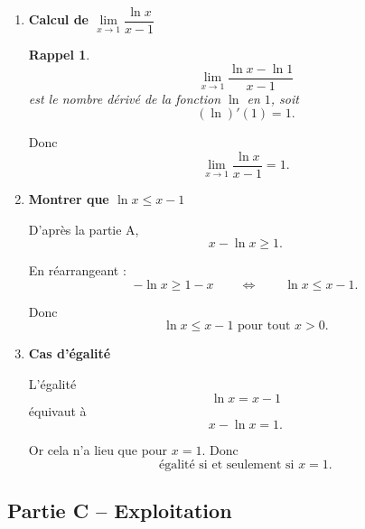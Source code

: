 \documentclass[11pt,a4paper]{article}
\newtheorem*{rappel}{Rappel}
\begin{document}
\begin{enumerate}[label=\textbf{1.\arabic*}, resume, leftmargin=1.6em]
Le dénominateur \((x-1)^2\) est strictement positif pour \(x\neq 1\).  
Le signe de \(f'(x)\) est donc celui de
\[
\frac{x-1}{x}-\ln x,
\]
qui est toujours négatif pour \(x\neq 1\).

Ainsi :
\[
\boxed{f \text{ est strictement décroissante sur } ]0,1[ \text{ et sur } ]1,+\infty[.}
\]

\item \textbf{Calcul de \(\lim\limits_{x\to 1}\dfrac{\ln x}{x-1}\)}

\begin{rappel}
\[
\lim_{x\to 1}\frac{\ln x-\ln 1}{x-1}
\]
est le nombre dérivé de la fonction \(\ln\) en \(1\), soit
\[
(\ln)'(1)=1.
\]
\end{rappel}

Donc
\[
\boxed{\lim_{x\to 1}\frac{\ln x}{x-1}=1.}
\]

\item \textbf{Montrer que \(\ln x\le x-1\)}

D’après la partie A,
\[
x-\ln x\ge 1.
\]

En réarrangeant :
\[
-\ln x \ge 1-x
\qquad\Longleftrightarrow\qquad
\ln x \le x-1.
\]

Donc
\[
\boxed{\ln x\le x-1 \text{ pour tout } x>0.}
\]

\item \textbf{Cas d’égalité}

L’égalité
\[
\ln x=x-1
\]
équivaut à
\[
x-\ln x=1.
\]

Or cela n’a lieu que pour \(x=1\). Donc
\[
\boxed{\text{égalité si et seulement si } x=1.}
\]

\end{enumerate}

\subsection*{Partie C -- Exploitation}
\end{document}
